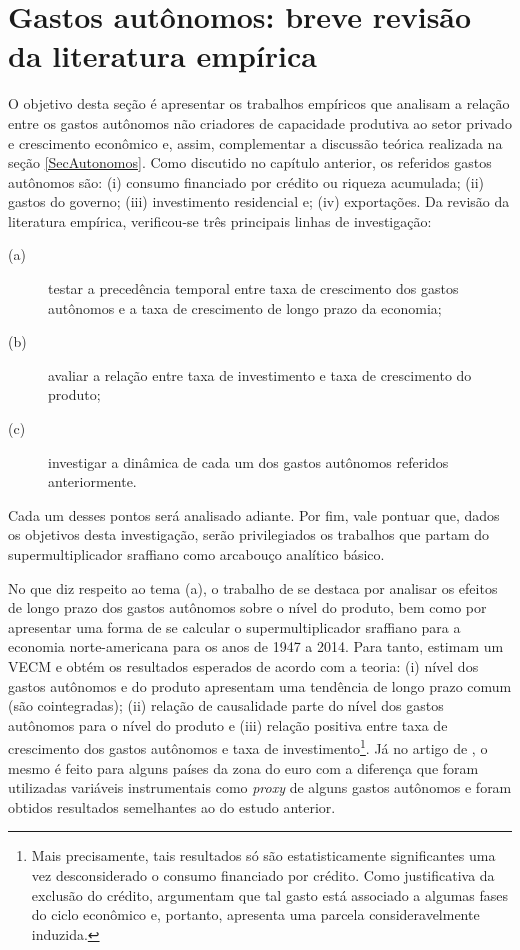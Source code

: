 \section{Gastos autônomos: breve revisão da literatura empírica}
\label{RevF}

O objetivo desta seção é apresentar os trabalhos empíricos que analisam a relação entre os gastos autônomos não criadores de capacidade produtiva ao setor privado e crescimento econômico e, assim, complementar a discussão teórica realizada na seção \ref{SecAutonomos}. Como discutido no capítulo anterior, os referidos gastos autônomos são:
(i) consumo financiado por crédito ou riqueza acumulada;
(ii) gastos do governo;
(iii) investimento residencial e;
(iv) exportações. 
Da revisão da literatura empírica, verificou-se três principais linhas de investigação: 
\begin{description}
	\item[(a)] testar a precedência temporal entre taxa de crescimento dos gastos autônomos e a taxa de crescimento de longo prazo da economia; 
	\item[(b)] avaliar a relação entre taxa de investimento e taxa de crescimento do produto;
	\item[(c)] investigar a dinâmica de cada um dos gastos autônomos referidos anteriormente.
\end{description}
Cada um desses pontos será analisado adiante. Por fim, vale pontuar que, dados os objetivos desta investigação, serão privilegiados os trabalhos que partam do supermultiplicador sraffiano como arcabouço analítico básico.

No que diz respeito ao tema (a), o trabalho de \textcite{girardi_long-run_2016} se destaca por analisar os efeitos de longo prazo dos gastos autônomos sobre  o nível do produto, bem como por apresentar uma forma de se calcular o supermultiplicador sraffiano para a economia norte-americana para os anos de 1947 a 2014. Para tanto, estimam um VECM e obtém os resultados esperados de acordo com a teoria: (i) nível dos gastos autônomos e do produto apresentam uma tendência de longo prazo comum  (são cointegradas); (ii) relação de causalidade parte do nível dos gastos autônomos para o nível do produto e (iii) relação positiva entre taxa de crescimento dos gastos autônomos e taxa de investimento\footnote{
	Mais precisamente, tais resultados só são estatisticamente significantes uma vez desconsiderado o consumo financiado por crédito. Como justificativa da exclusão do crédito, \textcite[p.~13]{girardi_long-run_2016} argumentam que tal gasto está associado a algumas fases do ciclo econômico e, portanto, apresenta uma parcela consideravelmente induzida.
}. Já no artigo de \textcite{girardi_autonomous_2018}, o mesmo é feito para alguns países da zona do euro com a diferença que foram utilizadas variáveis instrumentais como \textit{proxy} de alguns gastos autônomos e foram obtidos resultados semelhantes ao do estudo anterior. 

